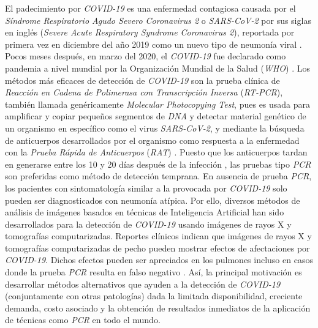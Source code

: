 El padecimiento por \textit{COVID-19} es una enfermedad contagiosa causada por el \textit{Síndrome
Respiratorio Agudo Severo Coronavirus 2} o \textit{SARS-CoV-2} por sus siglas en inglés
(\textit{Severe Acute Respiratory Syndrome Coronavirus 2}), reportada por primera vez en diciembre
del año 2019 como un nuevo tipo de neumonía viral \cite{huang2020clinical}. Pocos meses después,
en marzo del 2020, el \textit{COVID-19} fue declarado como pandemia a nivel mundial por la
Organización Mundial de la Salud (\textit{WHO}) \cite{world2020director}. Los métodos más eficaces
de detección de \textit{COVID-19} son la prueba clínica de \textit{Reacción en Cadena de Polimerasa con
Transcripción Inversa} (\textit{RT-PCR}), también llamada genéricamente \textit{Molecular Photocopying Test},
pues es usada para amplificar y copiar pequeños segmentos de \textit{DNA} y detectar material genético
de un organismo en específico como el virus \textit{SARS-CoV-2}, y mediante la búsqueda de anticuerpos
desarrollados por el organismo como respuesta a la enfermedad con la \textit{Prueba Rápida de Anticuerpos}
(\textit{RAT}) \cite{Gupta2021, Apra2021, pub.1136450856, LIU2021112817}. Puesto que los anticuerpos
tardan en generarse entre los 10 y 20 días después de la infección \cite{lou2020serology,o2021age,VABRET2020910},
las pruebas tipo \textit{PCR} son preferidas como método de detección temprana. En ausencia de prueba
\textit{PCR}, los pacientes con sintomatología similar a la provocada por \textit{COVID-19} solo pueden
ser diagnosticados con neumonía atípica. Por ello, diversos métodos de análisis de imágenes basados en
técnicas de Inteligencia Artificial han sido desarrollados para la detección de \textit{COVID-19} usando
imágenes de rayos X y tomografías computarizadas. Reportes clínicos indican que imágenes de rayos X y
tomografías computarizadas de pecho pueden mostrar efectos de afectaciones por \textit{COVID-19}. Dichos
efectos pueden ser apreciados en los pulmones incluso en casos donde la prueba \textit{PCR} resulta en
falso negativo \cite{ai2020correlation, wong2020frequency}. Así, la principal motivación es desarrollar
métodos alternativos que ayuden a la detección de \textit{COVID-19} (conjuntamente con otras patologías)
dada la limitada disponibilidad, creciente demanda, costo asociado y la obtención de resultados
inmediatos de la aplicación de técnicas como \textit{PCR} en todo el mundo.


